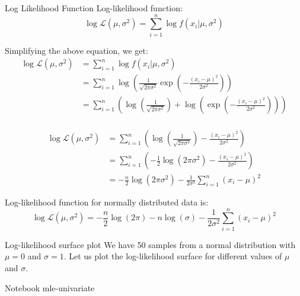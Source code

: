 \documentclass[handout]{beamer}
\begin{document}
\begin{frame}{Log Likelihood Function}
    Log-likelihood function:
    \begin{equation}
        \log \mathcal{L}(\mu, \sigma^2) = \sum_{i=1}^n \log f(x_i|\mu, \sigma^2)
    \end{equation}

    Simplifying the above equation, we get:
    \begin{align*}
        \log \mathcal{L}(\mu, \sigma^2) &= \sum_{i=1}^n \log f(x_i|\mu, \sigma^2) \\
        &= \sum_{i=1}^n \log \left( \frac{1}{\sqrt{2\pi\sigma^2}} \exp \left( -\frac{(x_i-\mu)^2}{2\sigma^2} \right) \right) \\
        &= \sum_{i=1}^n \left( \log \left( \frac{1}{\sqrt{2\pi\sigma^2}} \right) + \log \left( \exp \left( -\frac{(x_i-\mu)^2}{2\sigma^2} \right) \right) \right) \\
        \end{align*}
\end{frame}

\begin{frame}
   
    \begin{align*}
        \log \mathcal{L}(\mu, \sigma^2) &= \sum_{i=1}^n \left( \log \left( \frac{1}{\sqrt{2\pi\sigma^2}} \right) -\frac{(x_i-\mu)^2}{2\sigma^2} \right) \\
        &= \sum_{i=1}^n \left( -\frac{1}{2} \log (2\pi\sigma^2) -\frac{(x_i-\mu)^2}{2\sigma^2} \right) \\
        &= -\frac{n}{2} \log (2\pi\sigma^2) - \frac{1}{2\sigma^2} \sum_{i=1}^n (x_i-\mu)^2
        \end{align*}
        \begin{tcolorbox}[colback=metropolisblue!5,colframe=metropolisblue,title=Log Likelihood Function for Univariate Normal Distribution]
            Log-likelihood function for normally distributed data is:
            \[
                \log \mathcal{L}(\mu, \sigma^2) = -\frac{n}{2} \log(2\pi) - n\log(\sigma) - \frac{1}{2\sigma^2} \sum_{i=1}^n (x_i-\mu)^2
                \]
        \end{tcolorbox}
\end{frame}


\begin{frame}{Log-likelihood surface plot}
    We have 50 samples from a normal distribution with $\mu=0$ and $\sigma=1$. Let us plot the log-likelihood surface for different values of $\mu$ and $\sigma$.
    
Notebook mle-univariate

\end{frame}
\end{document}
